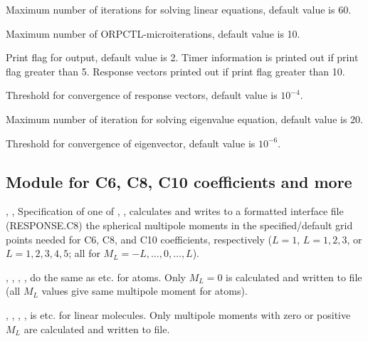 \begin{description}
\item{}
Maximum number of iterations for solving linear equations, default value is 60.

\item{}
Maximum number of ORPCTL-microiterations, default value is 10.

\item{}
Print flag for output, default value is 2. Timer information is printed
out if print flag greater than 5. Response vectors printed out if
print flag greater than 10.

\item{}
Threshold for convergence of response vectors, default value is $10^{-4}$.

\item{}
Maximum number of iteration for solving eigenvalue equation, default
value is 20.

\item{}
Threshold for convergence of eigenvector, default value is $10^{-6}$.

\end{description}

\subsection{Module for C6, C8, C10 coefficients and more}


\begin{description}

\item{, , }
Specification of one of , , 
calculates and writes to a formatted interface file (RESPONSE.C8) the spherical multipole
moments in the specified/default grid points needed for C6, C8, and C10
coefficients, respectively ($L=1$, $L=1,2,3$, or $L=1,2,3,4,5$;
all for $M_L = -L,\ldots,0,\ldots,L$).

\item{, , }
, ,  do the same as  etc. for
atoms. Only $M_L=0$ is
calculated and written to file (all $M_L$ values give same multipole moment 
for atoms).

\item{, , }
, ,  is  etc. for linear
molecules. Only
multipole moments with zero or positive $M_L$
are calculated and written to file.

\end{description}


